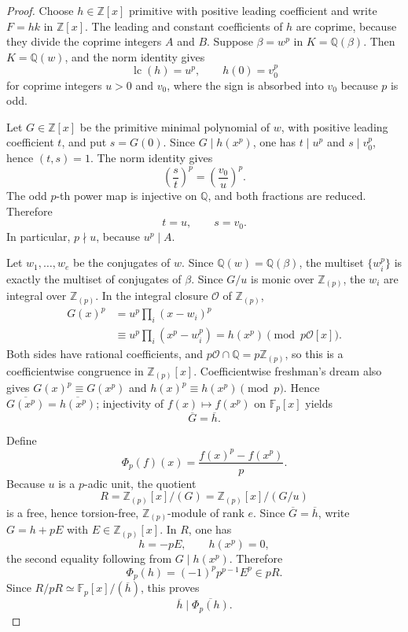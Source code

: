 \documentclass[11pt]{article}
\theoremstyle{definition}
\newcommand{\Q}{\mathbb Q}
\newcommand{\Z}{\mathbb Z}
\begin{document}
\begin{proof}
Choose \(h\in\Z[x]\) primitive with positive leading coefficient and write
\(F=hk\) in \(\Z[x]\).  The leading and constant coefficients of \(h\)
are coprime, because they divide the coprime integers \(A\) and \(B\).
Suppose \(\beta=w^p\) in \(K=\Q(\beta)\).  Then \(K=\Q(w)\), and the
norm identity gives
\[
 \operatorname{lc}(h)=u^p,\qquad h(0)=v_0^p
\]
for coprime integers \(u>0\) and \(v_0\), where the sign is absorbed into
\(v_0\) because \(p\) is odd.

Let \(G\in\Z[x]\) be the primitive minimal polynomial of \(w\), with
positive leading coefficient \(t\), and put \(s=G(0)\).  Since
\(G\mid h(x^p)\), one has \(t\mid u^p\) and \(s\mid v_0^p\), hence
\((t,s)=1\).  The norm identity gives
\[
 \left(\frac{s}{t}\right)^p
 =\left(\frac{v_0}{u}\right)^p.
\]
The odd \(p\)-th power map is injective on \(\Q\), and both fractions are
reduced.  Therefore
\[
 t=u,\qquad s=v_0.
\]
In particular, \(p\nmid u\), because \(u^p\mid A\).

Let \(w_1,\ldots,w_e\) be the conjugates of \(w\).  Since
\(\Q(w)=\Q(\beta)\), the multiset \(\{w_i^p\}\) is exactly the multiset
of conjugates of \(\beta\).  Since \(G/u\) is monic over
\(\Z_{(p)}\), the \(w_i\) are integral over \(\Z_{(p)}\).  In the
integral closure \(\mathcal O\) of \(\Z_{(p)}\),
\[
 \begin{aligned}
 G(x)^p
 &=u^p\prod_i(x-w_i)^p\\
 &\equiv u^p\prod_i(x^p-w_i^p)
 =h(x^p)\pmod {p\mathcal O[x]}.
 \end{aligned}
\]
Both sides have rational coefficients, and
\(p\mathcal O\cap\Q=p\Z_{(p)}\), so this is a coefficientwise congruence
in \(\Z_{(p)}[x]\).  Coefficientwise freshman's dream also gives
\(G(x)^p\equiv G(x^p)\) and
\(h(x)^p\equiv h(x^p)\pmod p\).  Hence
\(\overline{G(x^p)}=\overline{h(x^p)}\); injectivity of
\(f(x)\mapsto f(x^p)\) on \(\mathbb F_p[x]\) yields
\[
 \overline G=\overline h.
\]

Define
\[
 \Phi_p(f)(x)=\frac{f(x)^p-f(x^p)}p.
\]
Because \(u\) is a \(p\)-adic unit, the quotient
\[
 R=\Z_{(p)}[x]/(G)=\Z_{(p)}[x]/(G/u)
\]
is a free, hence torsion-free, \(\Z_{(p)}\)-module of rank \(e\).  Since \(\overline G=\overline h\), write
\(G=h+pE\) with \(E\in\Z_{(p)}[x]\).  In \(R\), one has
\[
 h=-pE,\qquad h(x^p)=0,
\]
the second equality following from \(G\mid h(x^p)\).  Therefore
\[
 \Phi_p(h)=(-1)^p p^{p-1}E^p\in pR.
\]
Since \(R/pR\simeq\mathbb F_p[x]/(\overline h)\), this proves
\[
 \overline h\mid\overline{\Phi_p(h)}.
\]


\end{proof}
\end{document}
